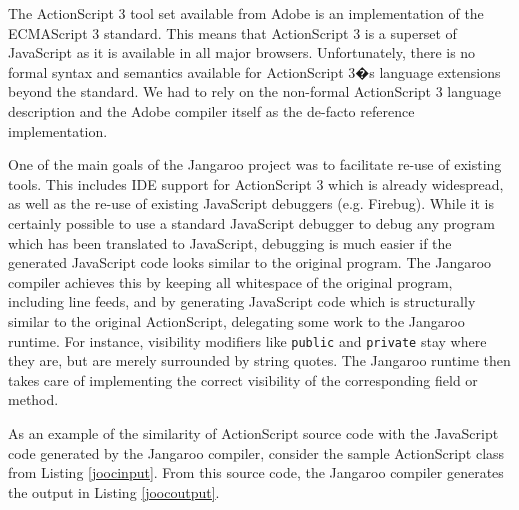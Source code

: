 \documentclass[10pt]{sigplanconf}
\begin{document}
The ActionScript 3 tool set available from Adobe is an implementation of the ECMAScript 3 standard\citep{ecma262-3rd}. This means that ActionScript 3 is a superset of Java\-Script as it is available in all major browsers. Unfortunately, there is no formal syntax and semantics available for ActionScript 3�s language extensions beyond the standard. We had to rely on the non-formal ActionScript 3 language description\citep{actionscript-reference} and the Adobe compiler itself\citep{mxmlc} as the de-facto reference implementation.

One of the main goals of the Jangaroo project was to facilitate re-use of existing tools. This includes IDE support for ActionScript 3 which is already widespread\citep{jwiki}, as well as the re-use of existing JavaScript debuggers (e.g. Firebug\citep{firefox-firebug-plugin}). While it is certainly possible to use a standard JavaScript debugger to debug any program which has been translated to JavaScript, debugging is much easier if the generated JavaScript code looks similar to the original program. The Jangaroo compiler achieves this by keeping all whitespace of the original program, including line feeds, and by generating JavaScript code which is structurally similar to the original ActionScript, delegating some work to the Jangaroo runtime. For instance, visibility modifiers like \texttt{public} and \texttt{private} stay where they are, but are merely surrounded by string quotes. The Jangaroo runtime then takes care of implementing the correct visibility of the corresponding field or method.

As an example of the similarity of ActionScript source code with the JavaScript code generated by the Jangaroo compiler, consider the sample ActionScript class from Listing \ref{joocinput}. From this source code, the Jangaroo compiler generates the output in Listing \ref{joocoutput}.




\end{document}
